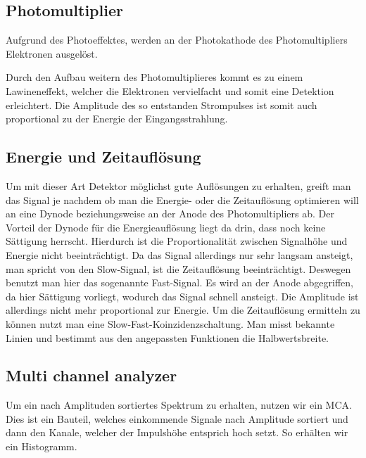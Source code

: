\documentclass[11pt, ngerman, fleqn, DIV=15, headinclude, BCOR=2cm]{scrreprt}
\begin{document}
\subsection{Photomultiplier}
Aufgrund des Photoeffektes, werden an der Photokathode des Photomultipliers
Elektronen ausgelöst.

Durch den Aufbau weitern des Photomultiplieres kommt es zu einem Lawineneffekt,
welcher die Elektronen vervielfacht und somit eine Detektion erleichtert.
Die Amplitude des so entstanden Strompulses ist somit auch proportional zu der
Energie der Eingangsstrahlung.

\subsection{Energie und Zeitauflösung}
Um mit dieser Art Detektor möglichst gute Auflösungen zu erhalten, greift man
das Signal je nachdem ob man die Energie- oder die Zeitauflösung optimieren will
an eine Dynode beziehungsweise an der Anode des Photomultipliers ab.
Der Vorteil der Dynode für die Energieauflösung liegt da drin, dass noch keine
Sättigung herrscht. Hierdurch ist die Proportionalität zwischen Signalhöhe und
Energie nicht beeinträchtigt. Da das Signal allerdings nur sehr langsam
ansteigt, man spricht von den Slow-Signal, ist die Zeitauflösung beeinträchtigt.
Deswegen benutzt man hier das sogenannte Fast-Signal. Es wird an der Anode
abgegriffen, da hier Sättigung vorliegt, wodurch das Signal schnell ansteigt.
Die Amplitude ist allerdings nicht mehr proportional zur Energie.
Um die Zeitauflösung ermitteln zu können nutzt man eine
Slow-Fast-Koinzidenzschaltung. Man misst bekannte Linien und bestimmt aus den
angepassten Funktionen die Halbwertsbreite.


\subsection{Multi channel analyzer}
Um ein nach Amplituden sortiertes Spektrum zu erhalten, nutzen wir ein MCA.
Dies ist ein Bauteil, welches einkommende Signale nach Amplitude sortiert und
dann den Kanale, welcher der Impulshöhe entsprich hoch setzt. So erhälten wir ein
Histogramm.
\end{document}
